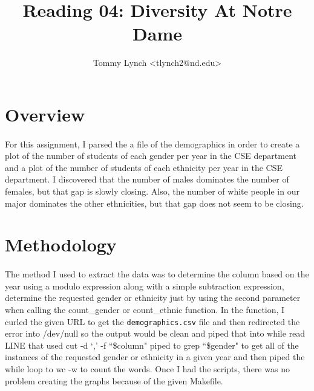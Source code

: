 \documentclass[letterpaper]{article}
\begin{document}

\title{Reading 04: Diversity At Notre Dame}
\date{}
\author{Tommy Lynch {\textless}tlynch2@nd.edu{\textgreater}}

\maketitle


\section*{Overview}

\paragraph{}

For this assignment, I parsed the a file of the demographics in order to create a
plot of the number of students of each gender per year in the CSE department and a 
plot of the number of students of each ethnicity per year in the CSE department. 
I discovered that the number of males dominates the number of females, but that
gap is slowly closing.  Also, the number of white people in our major dominates
the other ethnicities, but that gap does not seem to be closing.


\section*{Methodology}

\paragraph{}

The method I used to extract the data was to determine the column based on the 
year using a modulo expression along with a simple subtraction expression, determine
the requested gender or ethnicity just by using the second parameter when calling
the count\_gender or count\_ethnic function.  In the function, I curled the given URL 
to get the {\tt demographics.csv} file and then redirected the error into /dev/null 
so the output would be clean and piped that into  while read LINE that used 
cut -d `,' -f ``\$column" piped to grep ``\$gender" to get all of the instances of the 
requested gender or ethnicity in a given year and then piped the while loop to 
wc -w to count the words. Once I had the scripts, there was no problem creating the 
graphs because of the given Makefile.
\end{document}
